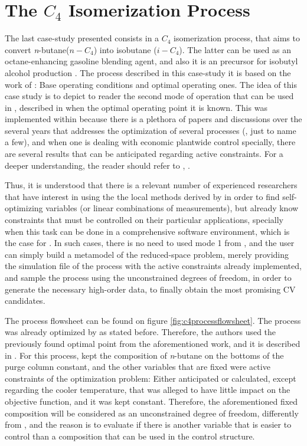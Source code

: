 \documentclass[../../msc-thesis.tex]{subfiles}
\begin{document}
\section{The $C_{4}$ Isomerization Process}

The last case-study presented consists in a $C_{4}$ isomerization process, 
that aims to convert \textit{n}-butane($n-C_{4}$) into isobutane ($i-C_{4}$). 
The latter can be used as an octane-enhancing gasoline blending agent, and 
also it is an precursor for isobutyl alcohol production 
\textcite{Jagtap2012}. The process described in this case-study it is based 
on the work of \cite{Jagtap2012}: Base operating conditions and optimal 
operating ones. The idea of this case study is to depict to reader the second
mode of operation that can be used in \mtc, described in 
 when the optimal operating point it is known. 
This was implemented within \mtc because there is a plethora of papers and 
discussions over the several years that addresses the optimization of several
processes (\cite{Jagtap2012,Jagtap2013,Araujo2007,Araujo2008,Gera2013,Liu2019,
Skogestad2004}, just to name a few), and when one is dealing with economic 
plantwide control specially, there are several results that can be anticipated 
regarding active constraints. For a deeper understanding, the reader should 
refer to , . 

Thus, it is understood that there is a relevant number of experienced 
researchers that have interest in using the the local methods derived by 
\textcite{Halvorsen2003,Alstad2009} in order to find self-optimizing variables 
(or linear combinations of measurements), but already know constraints that 
must be controlled on their particular applications, specially when this task 
can be done in a comprehensive software environment, which is the case for
\mtc. In such cases, there is no need to used mode 1 from \mtc, and the user 
can simply build a metamodel of the reduced-space problem, merely providing 
the simulation file of the process with the active constraints already 
implemented, and sample the process using the unconstrained degrees of 
freedom, in order to generate the necessary high-order data, to finally 
obtain the most promising CV candidates.

The process flowsheet can be found on figure \ref{fig:c4processflowsheet}. 
The process was already optimized by \textcite{Jagtap2012} as stated before. 
Therefore, the authors used the previously found optimal point from the 
aforementioned work, and it is described in . For this 
process, \textcite{Jagtap2012} kept the composition of \textit{n}-butane on 
the bottoms of the purge column constant, and the other variables that are 
fixed were active constraints of the optimization problem: Either anticipated 
or calculated, except regarding the cooler temperature, that was alleged to 
have little impact on the objective function, and it was kept constant. 
Therefore, the aforementioned fixed composition will be considered as an 
unconstrained degree of freedom, differently from \textcite{Jagtap2012}, 
and the reason is to evaluate if there is another variable that is easier 
to control than a composition that can be used in the control structure.
\end{document}
